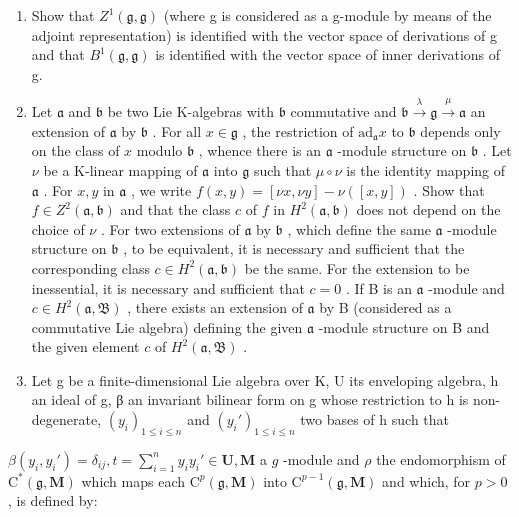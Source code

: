 \begin{enumerate}
\def\labelenumi{(\alph{enumi})}
\setcounter{enumi}{7}
\item
  Show that \(Z^{1}(\mathfrak{g},\mathfrak{g})\) (where g is considered as a g-module by means of the adjoint representation) is identified with the vector space of derivations of g and that \(B^{1}(\mathfrak{g},\mathfrak{g})\) is identified with the vector space of inner derivations of g.
\item
  Let \(\mathfrak{a}\) and \(\mathfrak{b}\) be two Lie K-algebras with \(\mathfrak{b}\) commutative and \(\mathfrak{b} \xrightarrow{\lambda} \mathfrak{g} \xrightarrow{\mu} \mathfrak{a}\) an extension of \(\mathfrak{a}\) by \(\mathfrak{b}\) . For all \(x \in \mathfrak{g}\) , the restriction of \(\mathrm{ad}_{\mathfrak{a}} x\) to \(\mathfrak{b}\) depends only on the class of \(x\) modulo \(\mathfrak{b}\) , whence there is an \(\mathfrak{a}\) -module structure on \(\mathfrak{b}\) . Let \(\nu\) be a K-linear mapping of \(\mathfrak{a}\) into \(\mathfrak{g}\) such that \(\mu \circ \nu\) is the identity mapping of \(\mathfrak{a}\) . For \(x, y\) in \(\mathfrak{a}\) , we write \(f(x, y) = [\nu x, \nu y] - \nu([x, y])\) . Show that \(f \in Z^2(\mathfrak{a}, \mathfrak{b})\) and that the class \(c\) of \(f\) in \(H^2(\mathfrak{a}, \mathfrak{b})\) does not depend on the choice of \(\nu\) . For two extensions of \(\mathfrak{a}\) by \(\mathfrak{b}\) , which define the same \(\mathfrak{a}\) -module structure on \(\mathfrak{b}\) , to be equivalent, it is necessary and sufficient that the corresponding class \(c \in H^2(\mathfrak{a}, \mathfrak{b})\) be the same. For the extension to be inessential, it is necessary and sufficient that \(c = 0\) . If B is an \(\mathfrak{a}\) -module and \(c \in H^2(\mathfrak{a}, \mathfrak{B})\) , there exists an extension of \(\mathfrak{a}\) by B (considered as a commutative Lie algebra) defining the given \(\mathfrak{a}\) -module structure on B and the given element \(c\) of \(H^2(\mathfrak{a}, \mathfrak{B})\) .
\item
  Let g be a finite-dimensional Lie algebra over K, U its enveloping algebra, h an ideal of g, β an invariant bilinear form on g whose restriction to h is non-degenerate, \((y_{i})_{1 \leqslant i \leqslant n}\) and \((y_{i}')_{1 \leqslant i \leqslant n}\) two bases of h such that
\end{enumerate}

 \(\beta(y_i, y_i') = \delta_{ij}, t = \sum_{i=1}^{n} y_i y_i' \in \mathbf{U}, \mathbf{M}\) a \(g\) -module and \(\rho\) the endomorphism of \(\mathrm{C}^*(\mathfrak{g}, \mathbf{M})\) which maps each \(\mathrm{C}^p(\mathfrak{g}, \mathbf{M})\) into \(\mathrm{C}^{p-1}(\mathfrak{g}, \mathbf{M})\) and which, for \(p > 0\) , is defined by:

